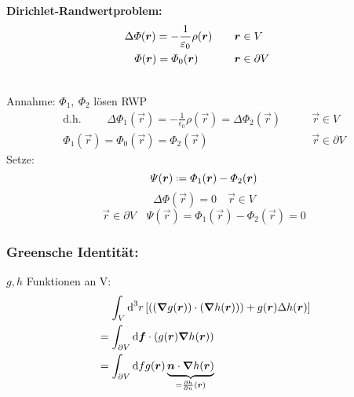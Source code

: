 \begin{minipage}{.6\linewidth}
	\textbf{Dirichlet-Randwertproblem:}
	\begin{align*}
	\Delta \varPhi(\bm{r}) = -\frac{1}{\varepsilon_0} \rho(\bm{r}) &\qquad \bm{r} \in V\\
	\varPhi(\bm{r}) = \varPhi_0 (\bm{r}) \quad \; &\qquad \bm{r} \in \partial V \quad \;
	\end{align*}
\end{minipage}%
\begin{minipage}{.4\linewidth}
	\centering
\end{minipage}%
\\
Annahme: $\Phi_1,\ \Phi_2$ lösen RWP
\begin{align*}
\textrm{d.h. }\qquad \Delta\Phi_1(\vec{r}) = -\frac{1}{\epsilon_0} \rho(\vec{r}) = \Delta \Phi_2 (\vec{r}) &\qquad \vec{r} \in V\\
\Phi_1 (\vec{r}) = \Phi_0(\vec{r}) = \Phi_2(\vec{r}) \quad \ &\qquad \vec{r} \in \partial V
\end{align*}
Setze:
\begin{equation*}
\varPsi(\vec{r}) \defeq \Phi_1(\vec{r}) - \Phi_2(\vec{r})
\end{equation*}
\begin{equation*}
\Delta \Phi(\vec{r}) = 0 \quad \vec{r} \in V 
\end{equation*}
\begin{equation*}
\vec{r} \in \partial V \quad \varPsi(\vec{r}) = \Phi_1(\vec{r}) - \Phi_2(\vec{r}) = 0
\end{equation*}

\subsubsection{Greensche Identität:}
$ g,h $ Funktionen an V:
\begin{align*}
&\ \ \ \, \int_V \textrm{d}^3 r \left[(\left(\bm{\nabla} g (\bm{r})\right) \cdot \left(\bm{\nabla} h(\bm{r}))\right) + g(\bm{r}) \Delta h(\bm{r})\right]\\
&= \int_{\partial V} \textrm{d}\bm{f} \cdot \left(g(\bm{r}) \bm{\nabla} h(\bm{r})\right)\\
&= \int_{\partial V} \textrm{d} f g(\bm{r}) \underbrace{\bm{n} \cdot \bm{\nabla} h(\bm{r})}_{= \frac{\partial h}{\partial n} (\bm{r})}
\end{align*}

